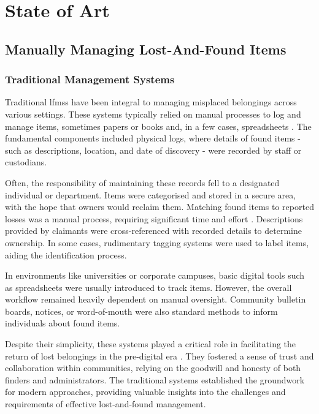 \chapter{State of Art}
\label{chapter:state_of_art}

\section{Manually Managing Lost-And-Found Items} \label{sec:manually-managing-lf-items}

\subsection{Traditional Management Systems} \label{subsec:traditional-lf-systems}

Traditional \acp{lfms} have been integral to managing misplaced belongings across various settings. These systems typically relied on manual processes to log and manage items, sometimes papers or books and, in a few cases, spreadsheets \cite{Anas2023}. The fundamental components included physical logs, where details of found items - such as descriptions, location, and date of discovery - were recorded by staff or custodians.

Often, the responsibility of maintaining these records fell to a designated individual or department. Items were categorised and stored in a secure area, with the hope that owners would reclaim them. Matching found items to reported losses was a manual process, requiring significant time and effort \cite{Anas2023}. Descriptions provided by claimants were cross-referenced with recorded details to determine ownership. In some cases, rudimentary tagging systems were used to label items, aiding the identification process.

In environments like universities or corporate campuses, basic digital tools such as spreadsheets were usually introduced to track items. However, the overall workflow remained heavily dependent on manual oversight. Community bulletin boards, notices, or word-of-mouth were also standard methods to inform individuals about found items.

Despite their simplicity, these systems played a critical role in facilitating the return of lost belongings in the pre-digital era \cite{Mayura2024}. They fostered a sense of trust and collaboration within communities, relying on the goodwill and honesty of both finders and administrators. The traditional systems established the groundwork for modern approaches, providing valuable insights into the challenges and requirements of effective lost-and-found management.

